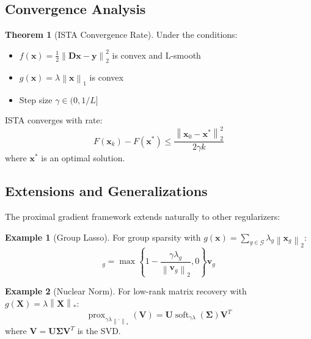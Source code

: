 \documentclass[12pt]{article}
\renewcommand{\vec}[1]{\mathbf{#1}}
\DeclareMathOperator{\prox}{prox}
\DeclareMathOperator{\soft}{soft}
\newcommand{\norm}[1]{\left\lVert#1\right\rVert}
\theoremstyle{definition}
\newtheorem{theorem}{Theorem}[section]
\newtheorem{example}{Example}[section]
\begin{document}
\subsection{Convergence Analysis}

\begin{theorem}[ISTA Convergence Rate]
    Under the conditions:
    \begin{itemize}
        \item $f(\vec{x}) = \frac{1}{2}\norm{\vec{D}\vec{x} - \vec{y}}_2^2$ is convex and L-smooth
        \item $g(\vec{x}) = \lambda\norm{\vec{x}}_1$ is convex
        \item Step size $\gamma \in (0, 1/L]$
    \end{itemize}
    ISTA converges with rate:
    \begin{equation}
        F(\vec{x}_k) - F(\vec{x}^*) \leq \frac{\norm{\vec{x}_0 - \vec{x}^*}_2^2}{2\gamma k}
    \end{equation}
    where $\vec{x}^*$ is an optimal solution.
\end{theorem}

\subsection{Extensions and Generalizations}

The proximal gradient framework extends naturally to other regularizers:

\begin{example}[Group Lasso]
    For group sparsity with $g(\vec{x}) = \sum_{g \in \mathcal{G}} \lambda_g\norm{\vec{x}_g}_2$:
    \begin{equation}
        [\prox_{\gamma g}(\vec{v})]_g = \max\left\{1 - \frac{\gamma\lambda_g}{\norm{\vec{v}_g}_2}, 0\right\}\vec{v}_g
    \end{equation}
\end{example}

\begin{example}[Nuclear Norm]
    For low-rank matrix recovery with $g(\vec{X}) = \lambda\norm{\vec{X}}_*$:
    \begin{equation}
        \prox_{\gamma\lambda\norm{\cdot}_*}(\vec{V}) = \vec{U}\soft_{\gamma\lambda}(\vec{\Sigma})\vec{V}^T
    \end{equation}
    where $\vec{V} = \vec{U}\vec{\Sigma}\vec{V}^T$ is the SVD.
\end{example}

\end{document}
